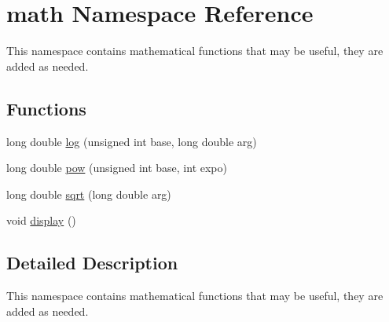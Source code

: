 \hypertarget{namespacemath}{\section{math Namespace Reference}
\label{namespacemath}
}


This namespace contains mathematical functions that may be useful, they are added as needed.  


\subsection*{Functions}
\begin{DoxyCompactItemize}
\item 
long double \hyperlink{namespacemath_a2d6a04a1c225921b2efca7ae69b48d18}{log} (unsigned int base, long double arg)
\item 
long double \hyperlink{namespacemath_a490d14342097d706bca88b313bca5452}{pow} (unsigned int base, int expo)
\item 
long double \hyperlink{namespacemath_aa06eb703529c6bb3854cd6e6f8a30df8}{sqrt} (long double arg)
\item 
void \hyperlink{namespacemath_a97d1d5e403fd9a832a3ab56836852838}{display} ()
\end{DoxyCompactItemize}


\subsection{Detailed Description}
This namespace contains mathematical functions that may be useful, they are added as needed. 

